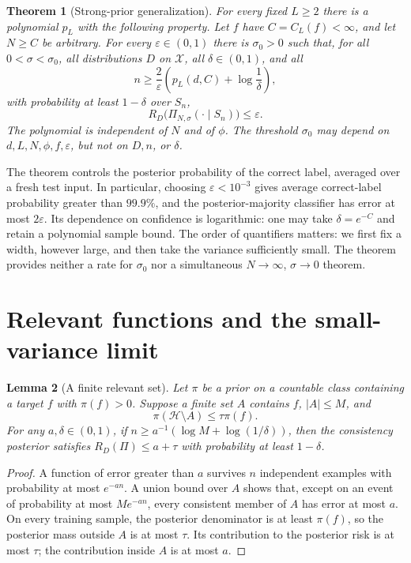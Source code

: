 \documentclass[11pt]{article}
\newtheorem{theorem}{Theorem}[section]
\newtheorem{lemma}[theorem]{Lemma}
\theoremstyle{definition}
\newcommand{\cH}{\mathcal H}
\newcommand{\cX}{\mathcal X}
\begin{document}
\begin{theorem}[Strong-prior generalization]\label{thm:learning}
For every fixed $L\geq2$ there is a polynomial $p_L$ with the following property. Let $f$ have $C=C_L(f)<\infty$, and let $N\geq C$ be arbitrary. For every $\varepsilon\in(0,1)$ there is $\sigma_0>0$ such that, for all $0<\sigma<\sigma_0$, all distributions $D$ on $\cX$, all $\delta\in(0,1)$, and all
\begin{equation}\label{eq:sample}
 n\geq\frac{2}{\varepsilon}\left(p_L(d,C)+\log\frac1\delta\right),
\end{equation}
with probability at least $1-\delta$ over $S_n$,
\[
 R_D\bigl(\Pi_{N,\sigma}(\cdot\mid S_n)\bigr)\leq\varepsilon.
\]
The polynomial is independent of $N$ and of $\phi$. The threshold $\sigma_0$ may depend on $d,L,N,\phi,f,\varepsilon$, but not on $D,n$, or $\delta$.
\end{theorem}

The theorem controls the posterior probability of the correct label, averaged over a fresh test input. In particular, choosing $\varepsilon<10^{-3}$ gives average correct-label probability greater than $99.9\%$, and the posterior-majority classifier has error at most $2\varepsilon$. Its dependence on confidence is logarithmic: one may take $\delta=e^{-C}$ and retain a polynomial sample bound. The order of quantifiers matters: we first fix a width, however large, and then take the variance sufficiently small. The theorem provides neither a rate for $\sigma_0$ nor a simultaneous $N\to\infty$, $\sigma\to0$ theorem.

\section{Relevant functions and the small-variance limit}
\begin{lemma}[A finite relevant set]\label{lem:relevance}
Let $\pi$ be a prior on a countable class containing a target $f$ with $\pi(f)>0$. Suppose a finite set $A$ contains $f$, $|A|\leq M$, and
\[
 \pi(\cH\setminus A)\leq\tau\pi(f).
\]
For any $a,\delta\in(0,1)$, if $n\geq a^{-1}(\log M+\log(1/\delta))$, then the consistency posterior satisfies $R_D(\Pi)\leq a+\tau$ with probability at least $1-\delta$.
\end{lemma}
\begin{proof}
A function of error greater than $a$ survives $n$ independent examples with probability at most $e^{-an}$. A union bound over $A$ shows that, except on an event of probability at most $Me^{-an}$, every consistent member of $A$ has error at most $a$. On every training sample, the posterior denominator is at least $\pi(f)$, so the posterior mass outside $A$ is at most $\tau$. Its contribution to the posterior risk is at most $\tau$; the contribution inside $A$ is at most $a$.
\end{proof}
\end{document}
